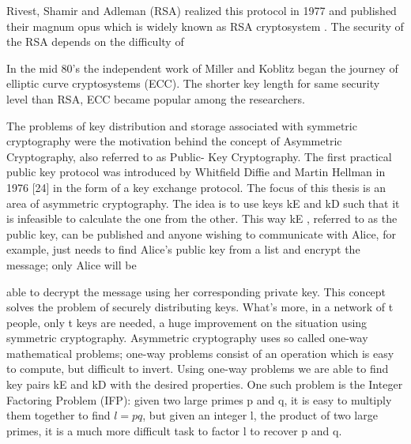 Rivest, Shamir and Adleman (RSA) realized this protocol in 1977 and published their magnum opus which is widely known as RSA cryptosystem \cite{rivest1978method}. 
The security of the RSA depends on the difficulty of 

In the mid 80's the independent work of Miller \cite{C:Miller85} and Koblitz \cite{koblitz1987elliptic} began the journey of elliptic curve cryptosystems (ECC). 
The shorter key length for same security level than RSA, ECC became popular among the researchers. 

The problems of key distribution and storage associated with symmetric cryptography were the motivation behind the concept of Asymmetric Cryptography, also referred to as Public- Key Cryptography. The first practical public key protocol was introduced by Whitfield Diffie and Martin Hellman in 1976 [24] in the form of a key exchange protocol. The focus of this thesis is an area of asymmetric cryptography. The idea is to use keys kE and kD such that it is infeasible to calculate the one from the other. This way kE , referred to as the public key, can be published and anyone wishing to communicate with Alice, for example, just needs to find Alice’s public key from a list and encrypt the message; only Alice will be 


able to decrypt the message using her corresponding private key. This concept solves the problem of securely distributing keys. What’s more, in a network of t people, only t keys are needed, a huge improvement on the situation using symmetric cryptography.
Asymmetric cryptography uses so called one-way mathematical problems; one-way problems consist of an operation which is easy to compute, but difficult to invert. Using one-way problems we are able to find key pairs kE and kD with the desired properties.
One such problem is the Integer Factoring Problem (IFP): given two large primes p and q, it is easy to multiply them together to find $l = pq$, but given an integer l, the product of two large primes, it is a much more difficult task to factor l to recover p and q.

